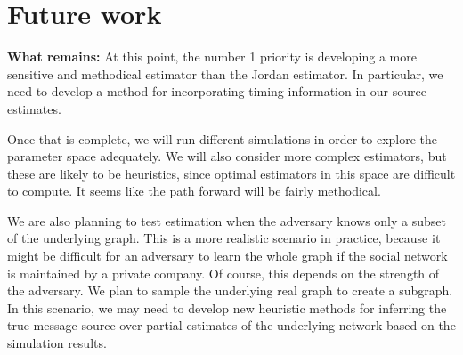 \section{Future work}
\textbf{What remains:} At this point, the number 1 priority is developing a more sensitive and methodical estimator than the Jordan estimator. In particular, we need to develop a method for incorporating timing information in our source estimates. 

Once that is complete, we will run different simulations in order to explore the parameter space adequately. We will also consider more complex estimators, but these are likely to be heuristics, since optimal estimators in this space are difficult to compute. It seems like the path forward will be fairly methodical.

We are also planning to test estimation when the adversary knows only a subset of the underlying graph. This is a more realistic scenario in practice, because it might be difficult for an adversary to learn the whole graph if the social network is maintained by a private company. Of course, this depends on the strength of the adversary. 
We plan to sample the underlying real graph to create a subgraph.
In this scenario, we may need to develop new heuristic methods for inferring the true message source over partial estimates of the underlying network based on the simulation results.

